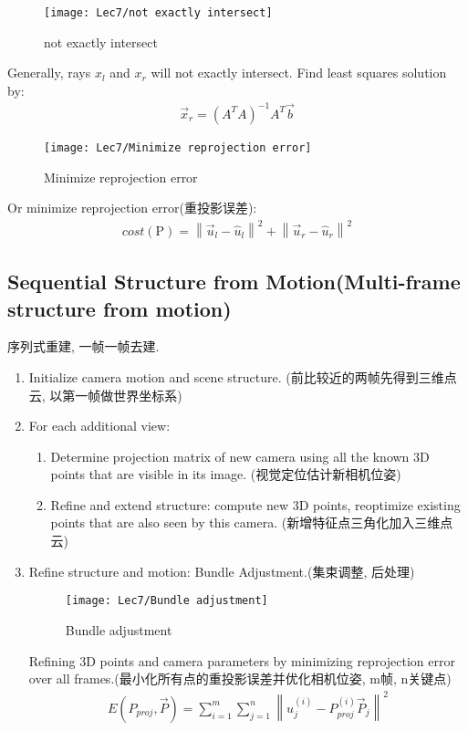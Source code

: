 \begin{figure}[H]
    \centering
    \texttt{[image: Lec7/not exactly intersect]}
    \caption{not exactly intersect}
\end{figure}

Generally, rays $x_l$ and $x_r$ will not exactly intersect. Find least squares solution by:
\begin{align*}
    \vec{x}_r=(A^TA)^{-1}A^T \vec{b}
\end{align*}

\begin{figure}[H]
    \centering
    \texttt{[image: Lec7/Minimize reprojection error]}
    \caption{Minimize reprojection error}
\end{figure}

Or minimize reprojection error(重投影误差):
\begin{align*}
    cost(\mathrm{P})=\left\| \vec{u}_l-\hat{u}_l \right\|^2+\left\| \vec{u}_r-\hat{u}_r \right\|^2
\end{align*}

\subsection{Sequential Structure from Motion(Multi-frame structure from motion)}
序列式重建, 一帧一帧去建. 

\begin{enumerate}
    \item Initialize camera motion and scene structure. (前比较近的两帧先得到三维点云, 以第一帧做世界坐标系)
    \item For each additional view: 
    \begin{enumerate}
        \item Determine projection matrix of new camera using all the known 3D points that are visible in its image. (视觉定位估计新相机位姿)
        \item Refine and extend structure: compute new 3D points, reoptimize existing points that are also seen by this camera. (新增特征点三角化加入三维点云)
    \end{enumerate}
    \item Refine structure and motion: Bundle Adjustment.(集束调整, 后处理) 
    
    \begin{figure}[H]
        \centering
        \texttt{[image: Lec7/Bundle adjustment]}
        \caption{Bundle adjustment}
    \end{figure}

    Refining 3D points and camera parameters by minimizing reprojection error over all frames.(最小化所有点的重投影误差并优化相机位姿, m帧, n关键点)
    \begin{align*}
        E(P_{proj},\vec{P})=\sum_{i=1}^m \sum_{j=1}^n \left\| u_j^{(i)}-P_{proj}^{(i)}\vec{P}_j \right\|^2
    \end{align*}
\end{enumerate}